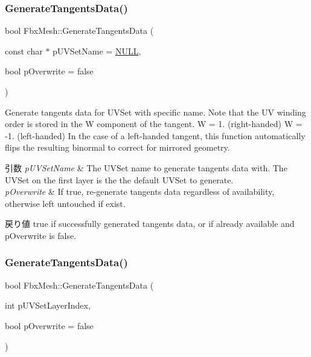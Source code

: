 \subsubsection{\texorpdfstring{Generate\+Tangents\+Data()}{GenerateTangentsData()}\hspace{0.1cm}{\footnotesize\ttfamily [1/2]}}
{\footnotesize\ttfamily bool Fbx\+Mesh\+::\+Generate\+Tangents\+Data (\begin{DoxyParamCaption}\item[{const char $\ast$}]{p\+U\+V\+Set\+Name = {\ttfamily \hyperlink{fbxarch_8h_a070d2ce7b6bb7e5c05602aa8c308d0c4}{N\+U\+LL}},  }\item[{bool}]{p\+Overwrite = {\ttfamily false} }\end{DoxyParamCaption})}

Generate tangents data for U\+V\+Set with specific name. Note that the UV winding order is stored in the W component of the tangent. W = 1. (right-\/handed) W = -\/1. (left-\/handed) In the case of a left-\/handed tangent, this function automatically flips the resulting binormal to correct for mirrored geometry. 
\begin{DoxyParams}{引数}
{\em p\+U\+V\+Set\+Name} & The U\+V\+Set name to generate tangents data with. The U\+V\+Set on the first layer is the the default U\+V\+Set to generate. \\
\hline
{\em p\+Overwrite} & If true, re-\/generate tangents data regardless of availability, otherwise left untouched if exist. \\
\hline
\end{DoxyParams}
\begin{DoxyReturn}{戻り値}
{\ttfamily true} if successfully generated tangents data, or if already available and p\+Overwrite is false. 
\end{DoxyReturn}
\mbox{\label{class_fbx_mesh_aca440ad11eb2fbeaa36cdeeff37e2551}} 
\subsubsection{\texorpdfstring{Generate\+Tangents\+Data()}{GenerateTangentsData()}\hspace{0.1cm}{\footnotesize\ttfamily [2/2]}}
{\footnotesize\ttfamily bool Fbx\+Mesh\+::\+Generate\+Tangents\+Data (\begin{DoxyParamCaption}\item[{int}]{p\+U\+V\+Set\+Layer\+Index,  }\item[{bool}]{p\+Overwrite = {\ttfamily false} }\end{DoxyParamCaption})}

